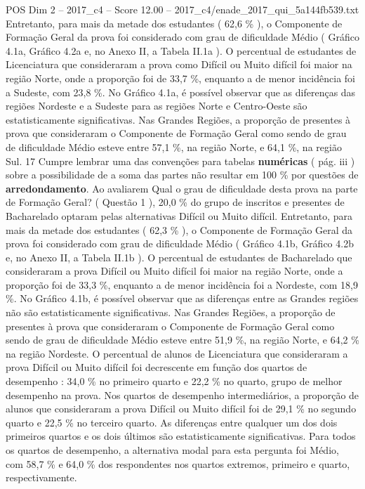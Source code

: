 \begin{textsample}{POS Dim 2 – 2017\_c4 – Score 12.00 – 2017\_c4/enade\_2017\_qui\_5a144fb539.txt}
Entretanto, para mais da metade dos estudantes ( 62,6 \% ), o Componente de Formação Geral da prova foi considerado com grau de dificuldade Médio ( Gráfico 4.1a, Gráfico 4.2a e, no Anexo II, a Tabela II.1a ).
O percentual de estudantes de Licenciatura que consideraram a prova como Difícil ou Muito difícil foi maior na região Norte, onde a proporção foi de 33,7 \%, enquanto a de menor incidência foi a Sudeste, com 23,8 \%.
No Gráfico 4.1a, é possível observar que as diferenças das regiões Nordeste e a Sudeste para as regiões Norte e Centro-Oeste são estatisticamente significativas.
Nas Grandes Regiões, a proporção de presentes à prova que consideraram o Componente de Formação Geral como sendo de grau de dificuldade Médio esteve entre 57,1 \%, na região Norte, e 64,1 \%, na região Sul. 17 Cumpre lembrar uma das convenções para tabelas \textbf{numéricas} ( pág. iii ) sobre a possibilidade de a soma das partes não resultar em 100 \% por questões de \textbf{arredondamento}.
Ao avaliarem Qual o grau de dificuldade desta prova na parte de Formação Geral? ( Questão 1 ), 20,0 \% do grupo de inscritos e presentes de Bacharelado optaram pelas alternativas Difícil ou Muito difícil.
Entretanto, para mais da metade dos estudantes ( 62,3 \% ), o Componente de Formação Geral da prova foi considerado com grau de dificuldade Médio ( Gráfico 4.1b, Gráfico 4.2b e, no Anexo II, a Tabela II.1b ).
O percentual de estudantes de Bacharelado que consideraram a prova Difícil ou Muito difícil foi maior na região Norte, onde a proporção foi de 33,3 \%, enquanto a de menor incidência foi a Nordeste, com 18,9 \%.
No Gráfico 4.1b, é possível observar que as diferenças entre as Grandes regiões não são estatisticamente significativas.
Nas Grandes Regiões, a proporção de presentes à prova que consideraram o Componente de Formação Geral como sendo de grau de dificuldade Médio esteve entre 51,9 \%, na região Norte, e 64,2 \% na região Nordeste.
O percentual de alunos de Licenciatura que consideraram a prova Difícil ou Muito difícil foi decrescente em função dos quartos de desempenho : 34,0 \% no primeiro quarto e 22,2 \% no quarto, grupo de melhor desempenho na prova.
Nos quartos de desempenho intermediários, a proporção de alunos que consideraram a prova Difícil ou Muito difícil foi de 29,1 \% no segundo quarto e 22,5 \% no terceiro quarto.
As diferenças entre qualquer um dos dois primeiros quartos e os dois últimos são estatisticamente significativas.
Para todos os quartos de desempenho, a alternativa modal para esta pergunta foi Médio, com 58,7 \% e 64,0 \% dos respondentes nos quartos extremos, primeiro e quarto, respectivamente.

\end{textsample}
